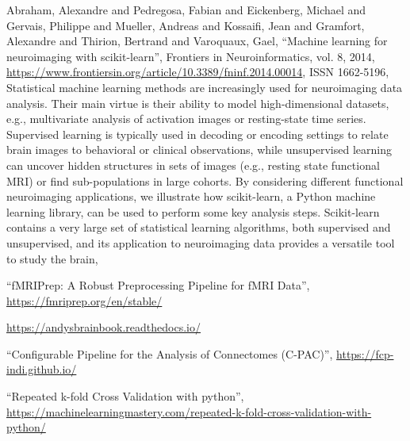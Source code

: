 \begin{thebibliography}{9}
Abraham, Alexandre and Pedregosa, Fabian and Eickenberg, Michael and Gervais, Philippe and Mueller, Andreas and Kossaifi, Jean and Gramfort, Alexandre and Thirion, Bertrand and Varoquaux, Gael,
``Machine learning for neuroimaging with scikit-learn'',
Frontiers in Neuroinformatics,
vol. 8,
2014,	
\url{https://www.frontiersin.org/article/10.3389/fninf.2014.00014},
ISSN 1662-5196,
Statistical machine learning methods are increasingly used for neuroimaging data analysis. Their main virtue is their ability to model high-dimensional datasets, e.g., multivariate analysis of activation images or resting-state time series. Supervised learning is typically used in decoding or encoding settings to relate brain images to behavioral or clinical observations, while unsupervised learning can uncover hidden structures in sets of images (e.g., resting state functional MRI) or find sub-populations in large cohorts. By considering different functional neuroimaging applications, we illustrate how scikit-learn, a Python machine learning library, can be used to perform some key analysis steps. Scikit-learn contains a very large set of statistical learning algorithms, both supervised and unsupervised, and its application to neuroimaging data provides a versatile tool to study the brain,

``fMRIPrep: A Robust Preprocessing Pipeline for fMRI Data'',
\url{https://fmriprep.org/en/stable/}

\url{https://andysbrainbook.readthedocs.io/}

``Configurable Pipeline for the Analysis of Connectomes (C-PAC)'',
\url{https://fcp-indi.github.io/}

    ``Repeated k-fold Cross Validation with python'',
    \url{https://machinelearningmastery.com/repeated-k-fold-cross-validation-with-python/}


\end{thebibliography}